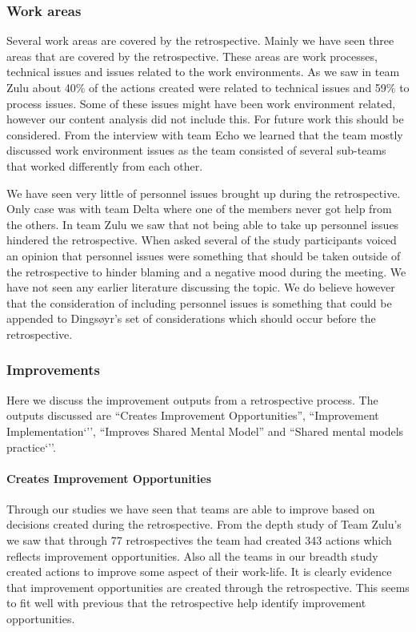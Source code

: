 \subsubsection{Work areas}

Several work areas are covered by the retrospective. Mainly we have seen three areas that are covered by the retrospective. These areas are work processes, technical issues and issues related to the work environments. As we saw in team Zulu about 40\% of the actions created were related to technical issues and 59\% to process issues. Some of these issues might have been work environment related, however our content analysis did not include this. For future work this should be considered. From the interview with team Echo we learned that the team mostly discussed work environment issues as the team consisted of several sub-teams that worked differently from each other. 

We have seen very little of personnel issues brought up during the retrospective. Only case was with team Delta where one of the members never got help from the others. In team Zulu we saw that not being able to take up personnel issues hindered the retrospective. When asked several of the study participants voiced an opinion that personnel issues were something that should be taken outside of the retrospective to hinder blaming and a negative mood during the meeting. We have not seen any earlier literature discussing the topic. We do believe however that the consideration of including personnel issues is something that could be appended to Dingsøyr's \cite{Dingsoyr2004} set of considerations which should occur before the retrospective.

\subsubsection{Improvements}
Here we discuss the improvement outputs from a retrospective process. The outputs discussed are ``Creates Improvement Opportunities'', ``Improvement Implementation`'', ``Improves Shared Mental Model'' and ``Shared mental models practice`''. 

\paragraph{Creates Improvement Opportunities}
Through our studies we have seen that teams are able to improve based on decisions created during the retrospective. From the depth study of Team Zulu's we saw that through 77 retrospectives the team had created 343 actions which reflects improvement opportunities. Also all the teams in our breadth study created actions to improve some aspect of their work-life. It is clearly evidence that improvement opportunities are created through the retrospective. This seems to fit well with previous \cite{Larsen2006, Dingsoyr2004, Drury2012} that the retrospective help identify improvement opportunities. 

